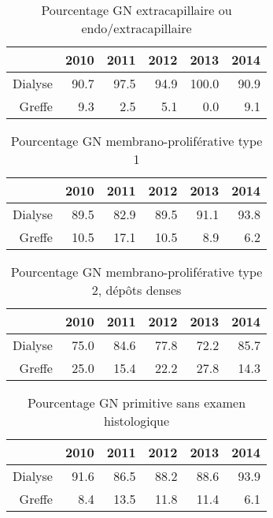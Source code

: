 \documentclass[11pt,a4paper]{article}\usepackage[]{graphicx}\usepackage[]{color}
\begin{document}
\begin{multicols}{2}
\begin{table}[H]
\centering
\begin{tabular}{rrrrrr}
  \hline
 & 2010 & 2011 & 2012 & 2013 & 2014 \\ 
  \hline
Dialyse & 90.7 & 97.5 & 94.9 & 100.0 & 90.9 \\ 
  Greffe & 9.3 & 2.5 & 5.1 & 0.0 & 9.1 \\ 
   \hline
\end{tabular}
\caption{Pourcentage GN extracapillaire ou endo/extracapillaire} 
\end{table}
\begin{table}[H]
\centering
\begin{tabular}{rrrrrr}
  \hline
 & 2010 & 2011 & 2012 & 2013 & 2014 \\ 
  \hline
Dialyse & 89.5 & 82.9 & 89.5 & 91.1 & 93.8 \\ 
  Greffe & 10.5 & 17.1 & 10.5 & 8.9 & 6.2 \\ 
   \hline
\end{tabular}
\caption{Pourcentage GN membrano-proliférative type 1} 
\end{table}
\begin{table}[H]
\centering
\begin{tabular}{rrrrrr}
  \hline
 & 2010 & 2011 & 2012 & 2013 & 2014 \\ 
  \hline
Dialyse & 75.0 & 84.6 & 77.8 & 72.2 & 85.7 \\ 
  Greffe & 25.0 & 15.4 & 22.2 & 27.8 & 14.3 \\ 
   \hline
\end{tabular}
\caption{Pourcentage GN membrano-proliférative type 2, dépôts denses} 
\end{table}
\begin{table}[H]
\centering
\begin{tabular}{rrrrrr}
  \hline
 & 2010 & 2011 & 2012 & 2013 & 2014 \\ 
  \hline
Dialyse & 91.6 & 86.5 & 88.2 & 88.6 & 93.9 \\ 
  Greffe & 8.4 & 13.5 & 11.8 & 11.4 & 6.1 \\ 
   \hline
\end{tabular}
\caption{Pourcentage GN primitive sans examen histologique} 

\end{table}
\end{multicols}
\end{document}
